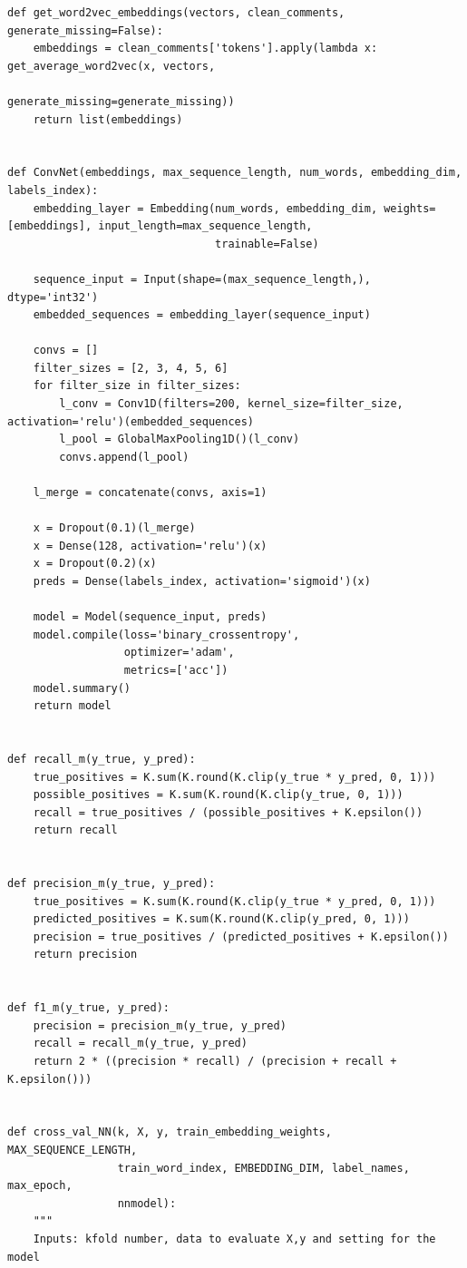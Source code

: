 \documentclass[11pt]{article} %
\begin{document}
\begin{verbatim}
def get_word2vec_embeddings(vectors, clean_comments, generate_missing=False):
    embeddings = clean_comments['tokens'].apply(lambda x: get_average_word2vec(x, vectors,
                                                                               generate_missing=generate_missing))
    return list(embeddings)


def ConvNet(embeddings, max_sequence_length, num_words, embedding_dim, labels_index):
    embedding_layer = Embedding(num_words, embedding_dim, weights=[embeddings], input_length=max_sequence_length,
                                trainable=False)

    sequence_input = Input(shape=(max_sequence_length,), dtype='int32')
    embedded_sequences = embedding_layer(sequence_input)

    convs = []
    filter_sizes = [2, 3, 4, 5, 6]
    for filter_size in filter_sizes:
        l_conv = Conv1D(filters=200, kernel_size=filter_size, activation='relu')(embedded_sequences)
        l_pool = GlobalMaxPooling1D()(l_conv)
        convs.append(l_pool)

    l_merge = concatenate(convs, axis=1)

    x = Dropout(0.1)(l_merge)
    x = Dense(128, activation='relu')(x)
    x = Dropout(0.2)(x)
    preds = Dense(labels_index, activation='sigmoid')(x)

    model = Model(sequence_input, preds)
    model.compile(loss='binary_crossentropy',
                  optimizer='adam',
                  metrics=['acc'])
    model.summary()
    return model


def recall_m(y_true, y_pred):
    true_positives = K.sum(K.round(K.clip(y_true * y_pred, 0, 1)))
    possible_positives = K.sum(K.round(K.clip(y_true, 0, 1)))
    recall = true_positives / (possible_positives + K.epsilon())
    return recall


def precision_m(y_true, y_pred):
    true_positives = K.sum(K.round(K.clip(y_true * y_pred, 0, 1)))
    predicted_positives = K.sum(K.round(K.clip(y_pred, 0, 1)))
    precision = true_positives / (predicted_positives + K.epsilon())
    return precision


def f1_m(y_true, y_pred):
    precision = precision_m(y_true, y_pred)
    recall = recall_m(y_true, y_pred)
    return 2 * ((precision * recall) / (precision + recall + K.epsilon()))


def cross_val_NN(k, X, y, train_embedding_weights, MAX_SEQUENCE_LENGTH,
                 train_word_index, EMBEDDING_DIM, label_names, max_epoch,
                 nnmodel):
    """
    Inputs: kfold number, data to evaluate X,y and setting for the model


\end{verbatim}
\end{document}
